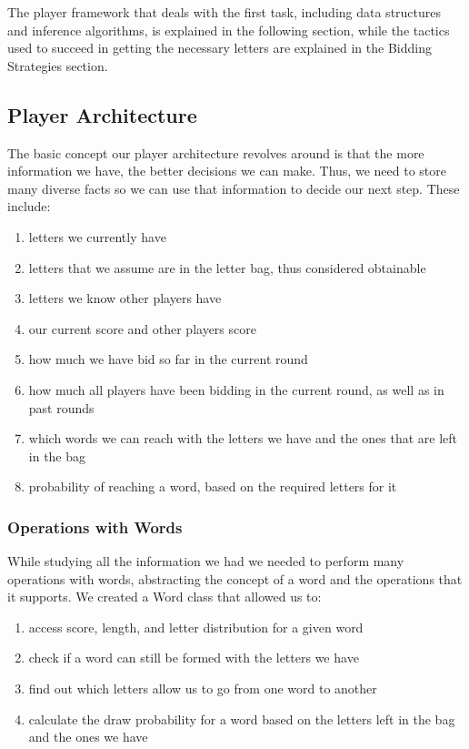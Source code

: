 \documentclass[11pt]{article}
\begin{document}
The player framework that deals with the first task, including data structures and inference algorithms, is explained in the following section, while the tactics used to succeed in getting the necessary letters are explained in the Bidding Strategies section. 

\subsection{Player Architecture}

The basic concept our player architecture revolves around is that the more information we have, the better decisions we can make. Thus, we need to store many diverse facts so we can use that information to decide our next step. These include:

\begin{enumerate}
\item letters we currently have
\item letters that we assume are in the letter bag, thus considered obtainable
\item letters we know other players have
\item our current score and other players score
\item how much we have bid so far in the current round
\item how much all players have been bidding in the current round, as well as in past rounds
\item which words we can reach with the letters we have and the ones that are left in the bag
\item probability of reaching a word, based on the required letters for it
\end{enumerate}

\subsubsection{Operations with Words}

While studying all the information we had we needed to perform many operations with words, abstracting the concept of a word and the operations that it supports. We created a Word class that allowed us to:

\begin{enumerate}
\item access score, length, and letter distribution for a given word
\item check if a word can still be formed with the letters we have
\item find out which letters allow us to go from one word to another
\item calculate the draw probability for a word based on the letters left in the bag and the ones we have
\end{enumerate}
\end{document}
